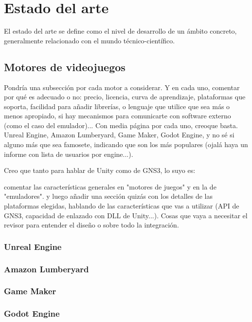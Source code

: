 \chapter{Estado del arte}\label{chap:ArtState}

El estado del arte se define como el nivel de desarrollo de un ámbito concreto, generalmente relacionado con el mundo técnico-científico.

\section{Motores de videojuegos}
Pondría una subsección por cada motor a considerar. Y en cada uno, comentar por qué es adecuado o no: precio, licencia, curva de aprendizaje, plataformas que soporta, facilidad para añadir librerías, o lenguaje que utilice que sea más o menos apropiado, si hay mecanismos para comunicarte con software externo (como el caso del emulador)... Con media página por cada uno, creoque basta. Unreal Engine, Amazon Lumberyard, Game Maker, Godot Engine, y no sé si alguno más que sea famosete, indicando que son los más populares (ojalá haya un informe con lista de usuarios por engine...).

Creo que tanto para hablar de Unity como de GNS3, lo suyo es:

comentar las características generales en "motores de juegos" y en la de "emuladores". y luego añadir una sección quizás con los detalles de las plataformas elegidas, hablando de las características que vas a utilizar (API de GNS3, capacidad de enlazado con DLL de Unity...). Cosas que vaya a necesitar el revisor para entender el diseño o sobre todo la integración.

\subsection{Unreal Engine}

\subsection{Amazon Lumberyard}

\subsection{Game Maker}

\subsection{Godot Engine}

